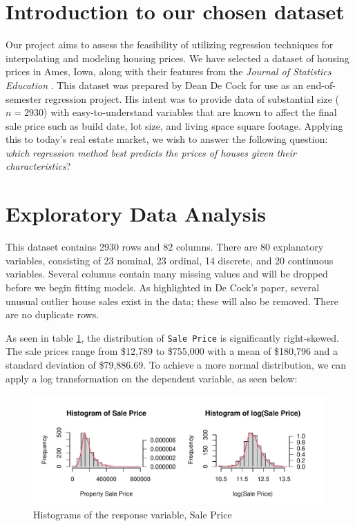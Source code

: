 \documentclass[aoas]{imsart}
\numberwithin{equation}{section}
\theoremstyle{plain}
\theoremstyle{remark}
\begin{document}
\newenvironment{kframe}{}{}

\hypertarget{introduction-to-our-chosen-dataset}{%
\section{Introduction to our chosen
dataset}\label{introduction-to-our-chosen-dataset}}

Our project aims to assess the feasibility of utilizing regression
techniques for interpolating and modeling housing prices. We have
selected a dataset of housing prices in Ames, Iowa, along with their
features from the \emph{Journal of Statistics Education}
\citep{cock2011amesdataset}. This dataset was prepared by Dean De Cock
for use as an end-of-semester regression project. His intent was to
provide data of substantial size (\(n=2930\)) with easy-to-understand
variables that are known to affect the final sale price such as build
date, lot size, and living space square footage. Applying this to
today's real estate market, we wish to answer the following question:
\emph{which regression method best predicts the prices of houses given
their characteristics}?

\hypertarget{exploratory-data-analysis}{%
\section{Exploratory Data Analysis}\label{exploratory-data-analysis}}

This dataset contains 2930 rows and 82 columns. There are 80 explanatory
variables, consisting of 23 nominal, 23 ordinal, 14 discrete, and 20
continuous variables. Several columns contain many missing values and
will be dropped before we begin fitting models. As highlighted in De
Cock's paper, several unusual outlier house sales exist in the data;
these will also be removed. There are no duplicate rows.

As seen in table \ref{resp}, the distribution of \texttt{Sale\ Price} is
significantly right-skewed. The sale prices range from \$12,789 to
\$755,000 with a mean of \$180,796 and a standard deviation of
\$79,886.69. To achieve a more normal distribution, we can apply a log
transformation on the dependent variable, as seen below:

\begin{figure}
\centering
\includegraphics{STAT-444-FINAL-PROJECT-PROPOSAL_files/figure-latex/unnamed-chunk-3-1.pdf}
\caption{Histograms of the response variable, Sale Price\label{resp}}
\end{figure}
\end{document}
